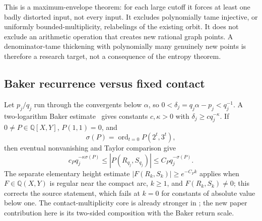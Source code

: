 \documentclass[11pt,oneside]{article}
\theoremstyle{definition}
\theoremstyle{remark}
\newcommand{\Q}{\mathbb Q}
\newcommand{\lean}[1]{\texttt{\detokenize{#1}}}
\newcommand{\ord}{\operatorname{ord}}
\begin{document}
This is a maximum-envelope theorem: for each large cutoff it forces at least one badly
distorted input, not every input.  It excludes polynomially tame injective, or uniformly
bounded-multiplicity, relabelings of the existing orbit.  It does not exclude an arithmetic
operation that creates new rational graph points.  A denominator-tame thickening with
polynomially many genuinely new points is therefore a research target, not a consequence of
the entropy theorem.

\subsection{Baker recurrence versus fixed contact}
\label{orbitheight:contact}

Let $p_j/q_j$ run through the convergents below $\alpha$, so
$0<\delta_j=q_j\alpha-p_j<q_j^{-1}$.  A two-logarithm Baker estimate~\cite{Baker1975} gives constants
$c,\kappa>0$ with $\delta_j\ge c q_j^{-\kappa}$.  If
$0\ne P\in\Q[X,Y]$, $P(1,1)=0$, and
\[
 \sigma(P)=\ord_{t=0}P(2^t,3^t),
\]
then eventual nonvanishing and Taylor comparison give
\begin{equation}
 c_Pq_j^{-\kappa\sigma(P)}
 \le |P(R_{q_j},S_{q_j})|
 \le C_Pq_j^{-\sigma(P)}.
 \label{orbitheight:eq-contact-window}
\end{equation}
The separate elementary height estimate
$|F(R_k,S_k)|\ge e^{-C_Fk}$ applies when $F\in\Q(X,Y)$ is regular near the compact arc,
$k\ge1$, and $F(R_k,S_k)\ne0$; this corrects the source statement, which fails at $k=0$
for constants of absolute value below one.  The contact-multiplicity core is already stronger in
\lean{RationalContactRigidity}; the new paper contribution here is its two-sided composition
with the Baker return scale.
\end{document}
